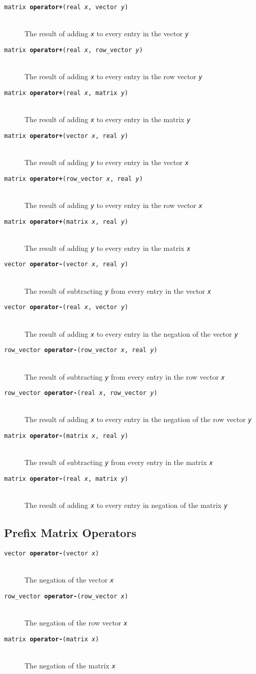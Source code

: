 \documentclass[10pt]{report}
\newcommand{\fitem}[4]{\item[{\tt #1 {\bfseries #2}(#3)}]\mbox{ } \\[4pt] #4}
\newcommand{\farg}[1]{{\tt\slshape #1}}
\begin{document}
\begin{description}
%
\fitem{matrix}{operator+}{real \farg{x}, vector \farg{y}}{The result of
adding \farg{x} to every entry in the vector \farg{y}}
%
\fitem{matrix}{operator+}{real \farg{x}, row\_vector \farg{y}}{The result of
adding \farg{x} to every entry in the row vector \farg{y}}
%
\fitem{matrix}{operator+}{real \farg{x}, matrix \farg{y}}{The result of
adding \farg{x} to every entry in the matrix \farg{y}}
%
\fitem{matrix}{operator+}{vector \farg{x}, real \farg{y}}{The result of
adding \farg{y} to every entry in the vector \farg{x}}
%
\fitem{matrix}{operator+}{row\_vector \farg{x}, real \farg{y}}{The result of
adding \farg{y} to every entry in the row vector \farg{x}}
%
\fitem{matrix}{operator+}{matrix \farg{x}, real \farg{y}}{The result of
adding \farg{y} to every entry in the matrix \farg{x}}
%
\end{description}
\vspace*{-4pt}
\begin{description}
%
\fitem{vector}{operator-}{vector \farg{x}, real \farg{y}}{The result of
subtracting \farg{y} from every entry in the vector \farg{x}}
%
\fitem{vector}{operator-}{real \farg{x}, vector \farg{y}}{The result of
adding \farg{x} to every entry in the negation of the vector \farg{y}}
%
\fitem{row\_vector}{operator-}{row\_vector \farg{x}, real \farg{y}}{The result of
subtracting \farg{y} from every entry in the row vector \farg{x}}
%
\fitem{row\_vector}{operator-}{real \farg{x}, row\_vector \farg{y}}{The result of
adding \farg{x} to every entry in the negation of the row vector \farg{y}}
%
\fitem{matrix}{operator-}{matrix \farg{x}, real \farg{y}}{The result of
subtracting \farg{y} from every entry in the matrix \farg{x}}
%
\fitem{matrix}{operator-}{real \farg{x}, matrix \farg{y}}{The result of
adding \farg{x} to every entry in negation of the matrix \farg{y}}
%
\end{description}


\subsection{Prefix Matrix Operators}

\begin{description}
%
\fitem{vector}{operator-}{vector \farg{x}}{The negation of the vector
  \farg{x}}
%
\fitem{row\_vector}{operator-}{row\_vector \farg{x}}{The negation of the row
  vector \farg{x}}
%
\fitem{matrix}{operator-}{matrix \farg{x}}{The negation of the matrix
    \farg{x}}
%
\end{description}
\end{document}
